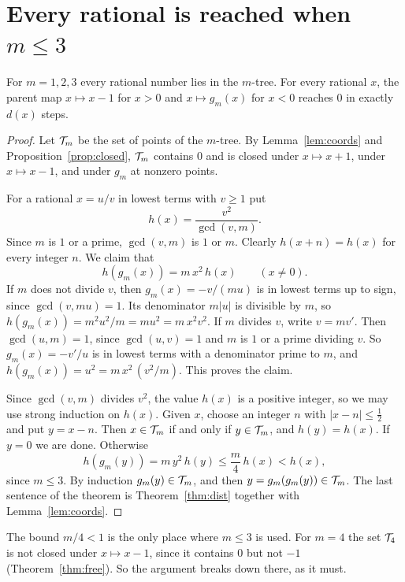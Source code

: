 \section{Every rational is reached when \texorpdfstring{$m\le3$}{m <= 3}}\label{sec:reach}

\begin{theorem}[Theorem~D]\label{thm:reach}
For $m=1,2,3$ every rational number lies in the $m$-tree. For every rational $x$, the parent map
$x\mapsto x-1$ for $x>0$ and $x\mapsto g_m(x)$ for $x<0$ reaches $0$ in exactly $d(x)$ steps.
\end{theorem}

\begin{proof}
Let $\mathcal{T}_m$ be the set of points of the $m$-tree. By Lemma~\ref{lem:coords} and
Proposition~\ref{prop:closed}, $\mathcal{T}_m$ contains $0$ and is closed under $x\mapsto x+1$, under
$x\mapsto x-1$, and under $g_m$ at nonzero points.

For a rational $x=u/v$ in lowest terms with $v\ge1$ put
\[
h(x)=\frac{v^2}{\gcd(v,m)} .
\]
Since $m$ is $1$ or a prime, $\gcd(v,m)$ is $1$ or $m$. Clearly $h(x+n)=h(x)$ for every integer
$n$. We claim that
\[
h(g_m(x))=m\,x^2\,h(x)\qquad(x\neq0).
\]
If $m$ does not divide $v$, then $g_m(x)=-v/(mu)$ is in lowest terms up to sign, since $\gcd(v,mu)=1$.
Its denominator $m|u|$ is divisible by $m$, so $h(g_m(x))=m^2u^2/m=mu^2=m\,x^2v^2$. If $m$ divides
$v$, write $v=mv'$. Then $\gcd(u,m)=1$, since $\gcd(u,v)=1$ and $m$ is $1$ or a prime dividing $v$.
So $g_m(x)=-v'/u$ is in lowest terms with a denominator prime to $m$, and
$h(g_m(x))=u^2=m\,x^2\,(v^2/m)$. This proves the claim.

Since $\gcd(v,m)$ divides $v^2$, the value $h(x)$ is a positive integer, so we may use strong
induction on $h(x)$. Given $x$, choose an integer $n$ with $|x-n|\le\tfrac12$ and put $y=x-n$. Then $x\in\mathcal{T}_m$ if
and only if $y\in\mathcal{T}_m$, and $h(y)=h(x)$. If $y=0$ we are done. Otherwise
\[
h(g_m(y))=m\,y^2\,h(y)\le\frac m4\,h(x)<h(x),
\]
since $m\le3$. By induction $g_m(y)\in\mathcal{T}_m$, and then $y=g_m(g_m(y))\in\mathcal{T}_m$. The last sentence
of the theorem is Theorem~\ref{thm:dist} together with Lemma~\ref{lem:coords}.
\end{proof}

The bound $m/4<1$ is the only place where $m\le3$ is used. For $m=4$ the set $\mathcal{T}_4$ is not closed
under $x\mapsto x-1$, since it contains $0$ but not $-1$ (Theorem~\ref{thm:free}). So the argument
breaks down there, as it must.
